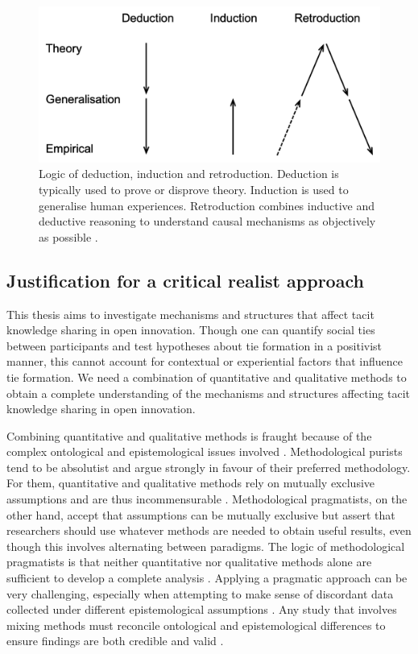 \begin{figure}[h!]
\centering
\includegraphics[width=0.7\linewidth]{Images/retroduction.png}
\caption[Logic of deduction, induction and retroduction]{Logic of deduction, induction and retroduction. Deduction is typically used to prove or disprove theory. Induction is used to generalise human experiences. Retroduction combines inductive and deductive reasoning to understand causal mechanisms as objectively as possible \citep{saether1998retroduction}.}
\label{fig:retroduction}
\end{figure}

\subsection{Justification for a critical realist approach}

This thesis aims to investigate mechanisms and structures that affect tacit knowledge sharing in open innovation. Though one can quantify social ties between participants and test hypotheses about tie formation in a positivist manner, this cannot account for contextual or experiential factors that influence tie formation. We need a combination of quantitative and qualitative methods to obtain a complete understanding of the mechanisms and structures affecting tacit knowledge sharing in open innovation. \medskip

Combining quantitative and qualitative methods is fraught because of the complex ontological and epistemological issues involved \citep{giddings2006mixed,mcevoy2006critical}. Methodological purists tend to be absolutist and argue strongly in favour of their preferred methodology. For them, quantitative and qualitative methods rely on mutually exclusive assumptions and are thus incommensurable \citep{greene2008mixed}. Methodological pragmatists, on the other hand, accept that assumptions can be mutually exclusive but assert that researchers should use whatever methods are needed to obtain useful results, even though this involves alternating between paradigms. The logic of methodological pragmatists is that neither quantitative nor qualitative methods alone are sufficient to develop a complete analysis \citep{mcevoy2006critical,creswell2013research}. Applying a pragmatic approach can be very challenging, especially when attempting to make sense of discordant data collected under different epistemological assumptions \citep{johnson2004mixed,giddings2006mixed}. Any study that involves mixing methods must reconcile ontological and epistemological differences to ensure findings are both credible and valid \citep{zachariadis2013methodological}. \medskip

